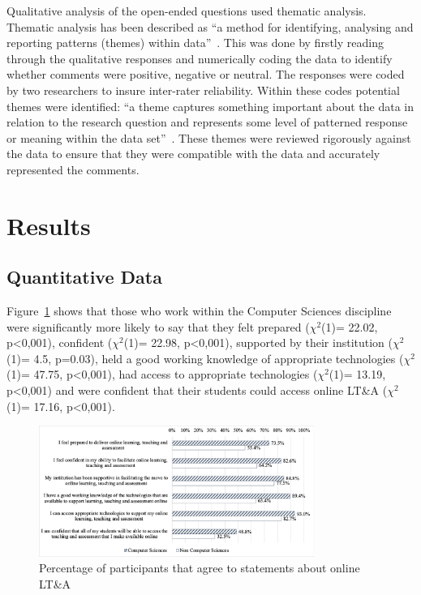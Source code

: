 \documentclass[sigconf]{acmart}
\begin{document}
Qualitative analysis of the open-ended questions used thematic
analysis. Thematic analysis has been described as ``a method for
identifying, analysing and reporting patterns (themes) within
data''~\cite[p.78]{braun+clarke:2006}. This was done by firstly reading
through the qualitative responses and numerically coding the data to
identify whether comments were positive, negative or neutral. The
responses were coded by two researchers to insure inter-rater
reliability. Within these codes potential themes were identified: ``a
theme captures something important about the data in relation to the
research question and represents some level of patterned response or
meaning within the data set''~\cite[p.82]{braun+clarke:2006}. These
themes were reviewed rigorously against the data to ensure that they
were compatible with the data and accurately represented the comments. 

\section{Results}\label{results}

\subsection{Quantitative Data}\label{quantdata}

Figure~\ref{fig:partagree} shows that those who work within the
Computer Sciences discipline were significantly more likely to say
that they felt prepared ($\chi^2$(1)= 22.02, p<0,001), confident
($\chi^2$(1)= 22.98, p<0,001), supported by their institution
($\chi^2$(1)= 4.5, p=0.03), held a good working knowledge of
appropriate technologies ($\chi^2$(1)= 47.75, p<0,001), had access to
appropriate technologies ($\chi^2$(1)= 13.19, p<0,001) and were
confident that their students could access online LT\&A ($\chi^2$(1)=
17.16, p<0,001).

\begin{figure}
\includegraphics[width=0.8\textwidth]{images/particagree.png}
\caption{Percentage of participants that agree to statements about
  online LT\&A}
\label{fig:partagree}
\end{figure}
\end{document}
